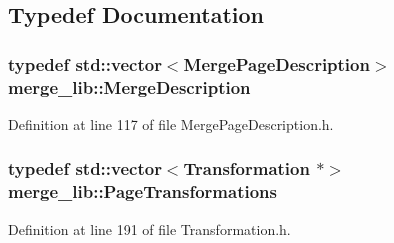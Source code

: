 \subsection{Typedef Documentation}
\hypertarget{namespacemerge__lib_a0a9efd2f197f07a92f4879b230a2e0b2}{
\subsubsection[{Merge\-Description}]{\setlength{\rightskip}{0pt plus 5cm}typedef std\-::vector$<${\bf Merge\-Page\-Description}$>$ {\bf merge\-\_\-lib\-::\-Merge\-Description}}}\label{d2/d27/namespacemerge__lib_a0a9efd2f197f07a92f4879b230a2e0b2}


Definition at line 117 of file Merge\-Page\-Description.\-h.

\hypertarget{namespacemerge__lib_abbc56c33e072a8c7b4494d50942a06a4}{
\subsubsection[{Page\-Transformations}]{\setlength{\rightskip}{0pt plus 5cm}typedef std\-::vector$<${\bf Transformation} $\ast$$>$ {\bf merge\-\_\-lib\-::\-Page\-Transformations}}}\label{d2/d27/namespacemerge__lib_abbc56c33e072a8c7b4494d50942a06a4}


Definition at line 191 of file Transformation.\-h.

